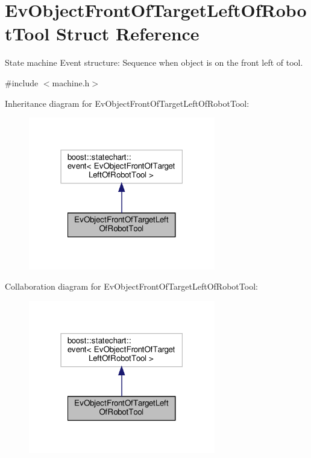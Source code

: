 \hypertarget{structEvObjectFrontOfTargetLeftOfRobotTool}{}\section{Ev\+Object\+Front\+Of\+Target\+Left\+Of\+Robot\+Tool Struct Reference}
\label{structEvObjectFrontOfTargetLeftOfRobotTool}


State machine Event structure\+: Sequence when object is on the front left of tool.  




{\ttfamily \#include $<$machine.\+h$>$}



Inheritance diagram for Ev\+Object\+Front\+Of\+Target\+Left\+Of\+Robot\+Tool\+:
\nopagebreak
\begin{figure}[H]
\begin{center}
\leavevmode
\includegraphics[width=231pt]{structEvObjectFrontOfTargetLeftOfRobotTool__inherit__graph}
\end{center}
\end{figure}


Collaboration diagram for Ev\+Object\+Front\+Of\+Target\+Left\+Of\+Robot\+Tool\+:
\nopagebreak
\begin{figure}[H]
\begin{center}
\leavevmode
\includegraphics[width=231pt]{structEvObjectFrontOfTargetLeftOfRobotTool__coll__graph}
\end{center}
\end{figure}


